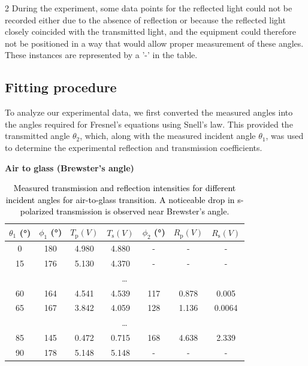 \documentclass[a4paper,oneside,article]{memoir}
\begin{document}
\begin{multicols}{2}
During the experiment, some data points for the reflected light could not be recorded either due to the absence of reflection or because the reflected light closely coincided with the transmitted light, and the equipment could therefore not be positioned in a way that would allow proper measurement of these angles. These instances are represented by a '-' in the table.

\subsection{Fitting procedure}

To analyze our experimental data, we first converted the measured angles into the angles required for Fresnel’s equations using Snell’s law. This provided the transmitted angle $\theta_2$, which, along with the measured incident angle $\theta_1$, was used to determine the experimental reflection and transmission coefficients.  

  



\begin{table}[H]
    \centering
    \footnotesize
    \textbf{Air to glass (Brewster's angle)} \\[0.5em]
    \begin{tabular}{|c|c|c|c|c|c|c|}
        \hline
        $\theta_1$ (°) & $\phi_1$ (°) & $T_{\text{p}} (V)$ & $T_{\text{s}} (V)$ & $\phi_2$ (°) & $R_{\text{p}} (V)$ & $R_{\text{s}} (V)$ \\
        \hline
        0  & 180 & 4.980 & 4.880 & -   & -     & -     \\
        15 & 176 & 5.130 & 4.370 & -   & -     & -     \\
        \hline
        \multicolumn{7}{|c|}{\dots} \\
        \hline
        60 & 164 & 4.541 & 4.539 & 117 & 0.878 & 0.005 \\
        65 & 167 & 3.842 & 4.059 & 128 & 1.136 & 0.0064 \\
        \hline
        \multicolumn{7}{|c|}{\dots} \\
        \hline
        85 & 145 & 0.472 & 0.715 & 168 & 4.638 & 2.339 \\
        90 & 178 & 5.148 & 5.148 & -   & -     & -     \\
        \hline
    \end{tabular}
    \caption{\textcolor{black}{Measured transmission and reflection intensities for different incident angles for air-to-glass transition. A noticeable drop in s-polarized transmission is observed near Brewster's angle.}}


\end{table}
\end{multicols}
\end{document}
